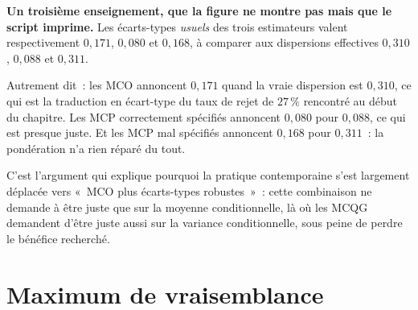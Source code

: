 \documentclass[10pt]{beamer}
\begin{document}
\begin{notes}

  \textbf{Un troisième enseignement, que la figure ne montre pas mais que le
    script imprime.} Les écarts-types \emph{usuels} des trois estimateurs valent
  respectivement $0{,}171$, $0{,}080$ et $0{,}168$, à comparer aux dispersions
  effectives $0{,}310$, $0{,}088$ et $0{,}311$.

  \bigskip

  Autrement dit~: les MCO annoncent $0{,}171$ quand la vraie dispersion est
  $0{,}310$, ce qui est la traduction en écart-type du taux de rejet de $27\,\%$
  rencontré au début du chapitre. Les MCP correctement spécifiés annoncent
  $0{,}080$ pour $0{,}088$, ce qui est presque juste. Et les MCP mal spécifiés
  annoncent $0{,}168$ pour $0{,}311$~: la pondération n'a rien réparé du tout.

  \bigskip


  \bigskip

  C'est l'argument qui explique pourquoi la pratique contemporaine s'est
  largement déplacée vers «~MCO plus écarts-types robustes~»~: cette
  combinaison ne demande à être juste que sur la moyenne conditionnelle, là où
  les MCQG demandent d'être juste aussi sur la variance conditionnelle, sous
  peine de perdre le bénéfice recherché.

\end{notes}


\section{Maximum de vraisemblance}
\end{document}
